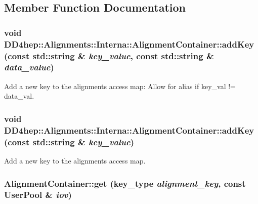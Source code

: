 \subsection{Member Function Documentation}
\hypertarget{class_d_d4hep_1_1_alignments_1_1_interna_1_1_alignment_container_acf31dddb1e9328a25ab5a7539b7b6eb0}{
\subsubsection[{addKey}]{\setlength{\rightskip}{0pt plus 5cm}void DD4hep::Alignments::Interna::AlignmentContainer::addKey (const std::string \& {\em key\_\-value}, \/  const std::string \& {\em data\_\-value})}}
\label{class_d_d4hep_1_1_alignments_1_1_interna_1_1_alignment_container_acf31dddb1e9328a25ab5a7539b7b6eb0}


Add a new key to the alignments access map: Allow for alias if key\_\-val != data\_\-val. \hypertarget{class_d_d4hep_1_1_alignments_1_1_interna_1_1_alignment_container_aff0df8ea16dc1a811cce12b6f702ce2b}{
\subsubsection[{addKey}]{\setlength{\rightskip}{0pt plus 5cm}void DD4hep::Alignments::Interna::AlignmentContainer::addKey (const std::string \& {\em key\_\-value})}}
\label{class_d_d4hep_1_1_alignments_1_1_interna_1_1_alignment_container_aff0df8ea16dc1a811cce12b6f702ce2b}


Add a new key to the alignments access map. \hypertarget{class_d_d4hep_1_1_alignments_1_1_interna_1_1_alignment_container_ae9d28749c0b244cac8d9206fca1c06fe}{
\subsubsection[{get}]{ AlignmentContainer::get ({\bf key\_\-type} {\em alignment\_\-key}, \/  const UserPool \& {\em iov})}}
\label{class_d_d4hep_1_1_alignments_1_1_interna_1_1_alignment_container_ae9d28749c0b244cac8d9206fca1c06fe}


